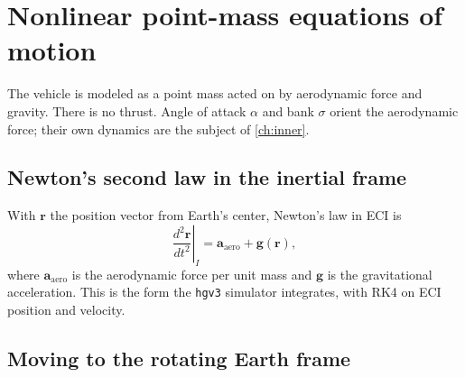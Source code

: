 \documentclass[11pt]{report}
\numberwithin{equation}{chapter}
\newcommand{\vb}[1]{\bm{#1}}
\newcommand{\code}[1]{\texttt{#1}}
\begin{document}
\chapter{Nonlinear point-mass equations of motion}\label{ch:eom}

The vehicle is modeled as a point mass acted on by aerodynamic force and gravity. There
is no thrust. Angle of attack $\alpha$ and bank $\sigma$ orient the aerodynamic force; their
own dynamics are the subject of \cref{ch:inner}.

\section{Newton's second law in the inertial frame}

With $\vb r$ the position vector from Earth's center, Newton's law in ECI is
\begin{equation}
  \left.\frac{d^2\vb r}{dt^2}\right|_I = \vb a_{\text{aero}} + \vb g(\vb r),
  \label{eq:newton}
\end{equation}
where $\vb a_{\text{aero}}$ is the aerodynamic force per unit mass and $\vb g$ is the
gravitational acceleration. This is the form the \code{hgv3} simulator integrates, with
RK4 on ECI position and velocity.

\section{Moving to the rotating Earth frame}
\end{document}
